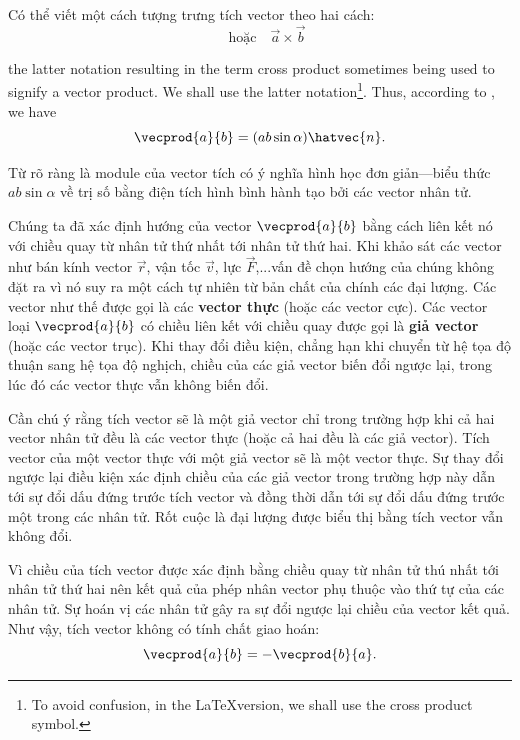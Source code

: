 Có thể viết một cách tượng trưng tích vector theo hai cách:
\begin{equation*}
[\vec{a},\vec{b}]\quad\text{hoặc}\quad \vec{a}\times\vec{b}
\end{equation*}

\noindent
the latter notation resulting in the term cross product sometimes being used to signify a vector product. We shall use the latter notation\footnote{To avoid confusion, in the \LaTeX version, we shall use the cross product symbol.}. Thus, according to , we have
\begin{equation}\label{eq:1_28}
\vecprod{a}{b} = (ab\sin\alpha)\hatvec{n}.
\end{equation}

Từ  rõ ràng là module của vector tích có ý nghĩa hình học đơn giản---biểu thức $ab\sin\alpha$ về trị số bằng điện tích hình bình hành tạo bởi các vector nhân tử.

Chúng ta đã xác định hướng của vector $\vecprod{a}{b}$ bằng cách liên kết nó với chiều quay từ nhân tử thứ nhất tới nhân tử thứ hai. Khi khảo sát các vector như bán kính vector $\vec{r}$, vận tốc $\vec{v}$, lực $\vec{F}$,...vấn đề chọn hướng của chúng không đặt ra vì nó suy ra một cách tự nhiên từ bản chất của chính các đại lượng. Các vector như thế được gọi là các \textbf{vector thực} (hoặc các vector cực). Các vector loại $\vecprod{a}{b}$ có chiều liên kết với chiều quay được gọi là \textbf{giả vector} (hoặc các vector trục). Khi thay đổi điều kiện, chẳng hạn khi chuyển từ hệ tọa độ thuận sang hệ tọa độ nghịch, chiều của các giả vector biến đổi ngược lại, trong lúc đó các vector thực vẫn không biến đổi.

Cần chú ý rằng tích vector sẽ là một giả vector chỉ trong trường hợp khi cả hai vector nhân tử đều là các vector thực (hoặc cả hai đều là các giả vector). Tích vector của một vector thực với một giả vector sẽ là một vector thực. Sự thay đổi ngược lại điều kiện xác định chiều của các giả vector trong trường hợp này dẫn tới sự đổi dấu đứng trước tích vector và đồng thời dẫn tới sự đổi dấu đứng trước một trong các nhân tử. Rốt cuộc là đại lượng được biểu thị bằng tích vector vẫn không đổi.

Vì chiều của tích vector được xác định bằng chiều quay từ nhân tử thú nhất tới nhân tử thứ hai nên kết quả của phép nhân vector phụ thuộc vào thứ tự của các nhân tử. Sự hoán vị các nhân tử gây ra sự đổi ngược lại chiều của vector kết quả. Như vậy, tích vector không có tính chất giao hoán:
\begin{equation}\label{eq:1_29}
\vecprod{a}{b} = -\vecprod{b}{a}.
\end{equation}

